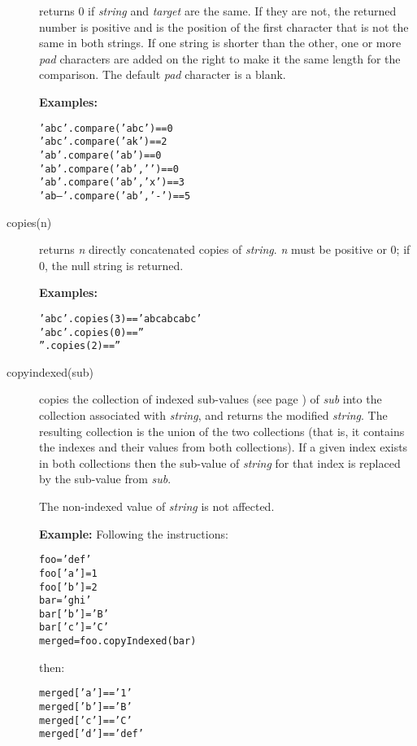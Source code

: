 \begin{description}
returns 0 if \emph{string} and \emph{target}
are the same.
If they are not, the returned number is positive and is the position of
the first character that is not the same in both strings.
If one string is shorter than the other, one or more \emph{pad}
characters are added on the right to make it the same length for the
comparison.
The default \emph{pad} character is a blank.
 
\textbf{Examples:}
\begin{alltt}
'abc'.compare('abc')      == 0
'abc'.compare('ak')       == 2
'ab '.compare('ab')       == 0
'ab '.compare('ab',' ')   == 0
'ab '.compare('ab','x')   == 3
'ab-- '.compare('ab','-') == 5
\end{alltt}
\item[copies(n)]\label{refcopies}

returns \emph{n} directly concatenated copies of
\emph{string}.
\emph{n} must be positive or 0; if 0, the null string is returned.
 
\textbf{Examples:}
\begin{alltt}
'abc'.copies(3) == 'abcabcabc'
'abc'.copies(0) == ''
''.copies(2)    == ''
\end{alltt}
\item[copyindexed(sub)]\label{refcopyind}
copies the collection of indexed  sub-values (see page \pageref{refinstr}) 
of \emph{sub} into the collection associated with
\emph{string}, and returns the modified \emph{string}.  The
resulting collection is the union of the two collections (that is,
it contains the indexes and their values from both collections).
If a given index exists in both collections then the sub-value of
\emph{string} for that index is replaced by the sub-value from
\emph{sub}.
 
The non-indexed value of \emph{string} is not affected.
 
\textbf{Example:}
 Following the instructions:
\begin{alltt}
foo='def'
foo['a']=1
foo['b']=2
bar='ghi'
bar['b']='B'
bar['c']='C'
merged=foo.copyIndexed(bar)
\end{alltt}
then:
\begin{alltt}
merged['a'] == '1'
merged['b'] == 'B'
merged['c'] == 'C'
merged['d'] == 'def'
\end{alltt}



\end{description}
